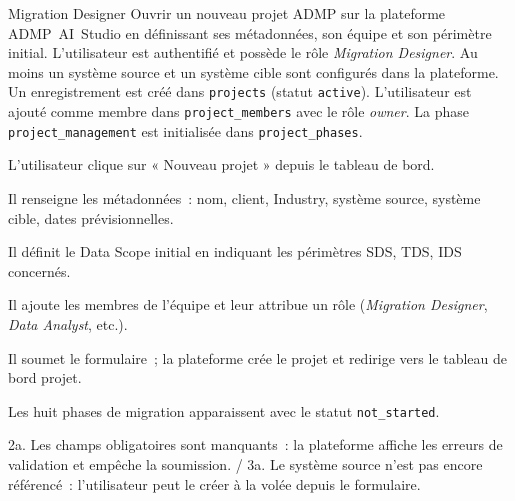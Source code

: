%
{Migration Designer}%
{Ouvrir un nouveau projet ADMP sur la plateforme ADMP~AI~Studio en définissant ses métadonnées, son équipe et son périmètre initial.}%
{L'utilisateur est authentifié et possède le rôle \textit{Migration Designer}. Au moins un système source et un système cible sont configurés dans la plateforme.}%
{Un enregistrement est créé dans \texttt{projects} (statut \texttt{active}). L'utilisateur est ajouté comme membre dans \texttt{project\_members} avec le rôle \textit{owner}. La phase \texttt{project\_management} est initialisée dans \texttt{project\_phases}.}%
{%
\item L'utilisateur clique sur « Nouveau projet » depuis le tableau de bord.
\item Il renseigne les métadonnées~: nom, client, Industry, système source, système cible, dates prévisionnelles.
\item Il définit le Data Scope initial en indiquant les périmètres SDS, TDS, IDS concernés.
\item Il ajoute les membres de l'équipe et leur attribue un rôle (\textit{Migration Designer}, \textit{Data Analyst}, etc.).
\item Il soumet le formulaire~; la plateforme crée le projet et redirige vers le tableau de bord projet.
\item Les huit phases de migration apparaissent avec le statut \texttt{not\_started}.
}%
{2a. Les champs obligatoires sont manquants~: la plateforme affiche les erreurs de validation et empêche la soumission. / 3a. Le système source n'est pas encore référencé~: l'utilisateur peut le créer à la volée depuis le formulaire.}

